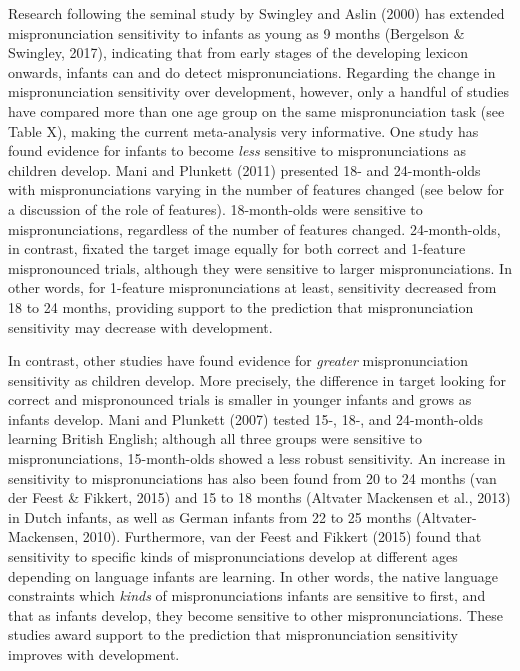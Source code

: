 \documentclass[man]{apa6}
\theoremstyle{definition}
\theoremstyle{definition}
\theoremstyle{definition}
\theoremstyle{remark}
\begin{document}
Research following the seminal study by Swingley and Aslin (2000) has
extended mispronunciation sensitivity to infants as young as 9 months
(Bergelson \& Swingley, 2017), indicating that from early stages of the
developing lexicon onwards, infants can and do detect mispronunciations.
Regarding the change in mispronunciation sensitivity over development,
however, only a handful of studies have compared more than one age group
on the same mispronunciation task (see Table X), making the current
meta-analysis very informative. One study has found evidence for infants
to become \emph{less} sensitive to mispronunciations as children
develop. Mani and Plunkett (2011) presented 18- and 24-month-olds with
mispronunciations varying in the number of features changed (see below
for a discussion of the role of features). 18-month-olds were sensitive
to mispronunciations, regardless of the number of features changed.
24-month-olds, in contrast, fixated the target image equally for both
correct and 1-feature mispronounced trials, although they were sensitive
to larger mispronunciations. In other words, for 1-feature
mispronunciations at least, sensitivity decreased from 18 to 24 months,
providing support to the prediction that mispronunciation sensitivity
may decrease with development.

In contrast, other studies have found evidence for \emph{greater}
mispronunciation sensitivity as children develop. More precisely, the
difference in target looking for correct and mispronounced trials is
smaller in younger infants and grows as infants develop. Mani and
Plunkett (2007) tested 15-, 18-, and 24-month-olds learning British
English; although all three groups were sensitive to mispronunciations,
15-month-olds showed a less robust sensitivity. An increase in
sensitivity to mispronunciations has also been found from 20 to 24
months (van der Feest \& Fikkert, 2015) and 15 to 18 months (Altvater
Mackensen et al., 2013) in Dutch infants, as well as German infants from
22 to 25 months (Altvater-Mackensen, 2010). Furthermore, van der Feest
and Fikkert (2015) found that sensitivity to specific kinds of
mispronunciations develop at different ages depending on language
infants are learning. In other words, the native language constraints
which \emph{kinds} of mispronunciations infants are sensitive to first,
and that as infants develop, they become sensitive to other
mispronunciations. These studies award support to the prediction that
mispronunciation sensitivity improves with development.
\end{document}
